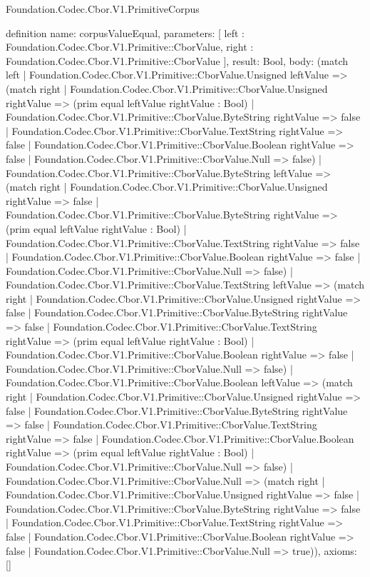 \begin{lexlean}{Foundation.Codec.Cbor.V1.PrimitiveCorpus}
\begin{semanticmodule}
definition{
  name: corpusValueEqual,
  parameters: [
    left : Foundation.Codec.Cbor.V1.Primitive::CborValue,
    right : Foundation.Codec.Cbor.V1.Primitive::CborValue
  ],
  result: Bool,
  body: (match left
    | Foundation.Codec.Cbor.V1.Primitive::CborValue.Unsigned leftValue => (match right
      | Foundation.Codec.Cbor.V1.Primitive::CborValue.Unsigned rightValue => (prim equal leftValue rightValue : Bool)
      | Foundation.Codec.Cbor.V1.Primitive::CborValue.ByteString rightValue => false
      | Foundation.Codec.Cbor.V1.Primitive::CborValue.TextString rightValue => false
      | Foundation.Codec.Cbor.V1.Primitive::CborValue.Boolean rightValue => false
      | Foundation.Codec.Cbor.V1.Primitive::CborValue.Null => false)
    | Foundation.Codec.Cbor.V1.Primitive::CborValue.ByteString leftValue => (match right
      | Foundation.Codec.Cbor.V1.Primitive::CborValue.Unsigned rightValue => false
      | Foundation.Codec.Cbor.V1.Primitive::CborValue.ByteString rightValue => (prim equal leftValue rightValue : Bool)
      | Foundation.Codec.Cbor.V1.Primitive::CborValue.TextString rightValue => false
      | Foundation.Codec.Cbor.V1.Primitive::CborValue.Boolean rightValue => false
      | Foundation.Codec.Cbor.V1.Primitive::CborValue.Null => false)
    | Foundation.Codec.Cbor.V1.Primitive::CborValue.TextString leftValue => (match right
      | Foundation.Codec.Cbor.V1.Primitive::CborValue.Unsigned rightValue => false
      | Foundation.Codec.Cbor.V1.Primitive::CborValue.ByteString rightValue => false
      | Foundation.Codec.Cbor.V1.Primitive::CborValue.TextString rightValue => (prim equal leftValue rightValue : Bool)
      | Foundation.Codec.Cbor.V1.Primitive::CborValue.Boolean rightValue => false
      | Foundation.Codec.Cbor.V1.Primitive::CborValue.Null => false)
    | Foundation.Codec.Cbor.V1.Primitive::CborValue.Boolean leftValue => (match right
      | Foundation.Codec.Cbor.V1.Primitive::CborValue.Unsigned rightValue => false
      | Foundation.Codec.Cbor.V1.Primitive::CborValue.ByteString rightValue => false
      | Foundation.Codec.Cbor.V1.Primitive::CborValue.TextString rightValue => false
      | Foundation.Codec.Cbor.V1.Primitive::CborValue.Boolean rightValue => (prim equal leftValue rightValue : Bool)
      | Foundation.Codec.Cbor.V1.Primitive::CborValue.Null => false)
    | Foundation.Codec.Cbor.V1.Primitive::CborValue.Null => (match right
      | Foundation.Codec.Cbor.V1.Primitive::CborValue.Unsigned rightValue => false
      | Foundation.Codec.Cbor.V1.Primitive::CborValue.ByteString rightValue => false
      | Foundation.Codec.Cbor.V1.Primitive::CborValue.TextString rightValue => false
      | Foundation.Codec.Cbor.V1.Primitive::CborValue.Boolean rightValue => false
      | Foundation.Codec.Cbor.V1.Primitive::CborValue.Null => true)),
  axioms: []
}


\end{semanticmodule}
\end{lexlean}
